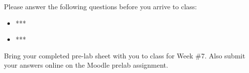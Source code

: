 Please answer the following questions before you arrive to class:

\begin{exer}

\begin{itemize}

\item ***

  \evalline
  
\item ***

  \evalline
  
\end{itemize}

\end{exer}

Bring your completed pre-lab sheet with you to class for Week \#7. Also submit your answers online on the Moodle prelab assignment.  

